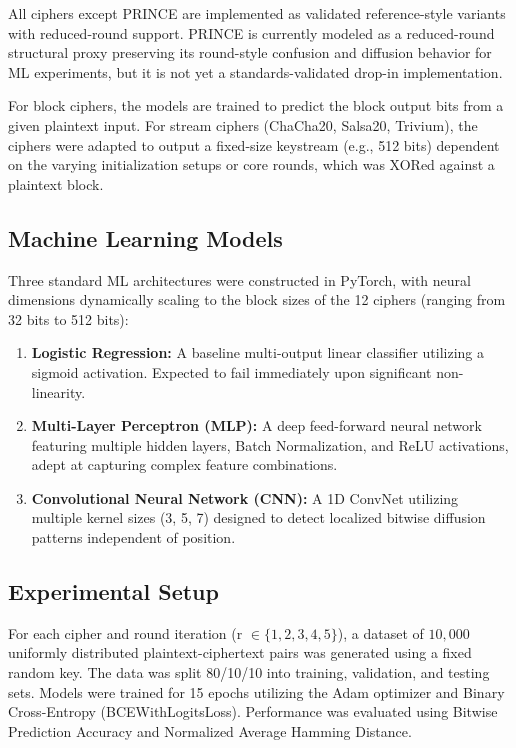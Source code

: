 \documentclass[11pt,a4paper]{article}
\begin{document}
All ciphers except PRINCE are implemented as validated reference-style variants with reduced-round support. PRINCE is currently modeled as a reduced-round structural proxy preserving its round-style confusion and diffusion behavior for ML experiments, but it is not yet a standards-validated drop-in implementation.

For block ciphers, the models are trained to predict the block output bits from a given plaintext input. For stream ciphers (ChaCha20, Salsa20, Trivium), the ciphers were adapted to output a fixed-size keystream (e.g., 512 bits) dependent on the varying initialization setups or core rounds, which was XORed against a plaintext block.

\subsection{Machine Learning Models}
Three standard ML architectures were constructed in PyTorch, with neural dimensions dynamically scaling to the block sizes of the 12 ciphers (ranging from 32 bits to 512 bits):
\begin{enumerate}
    \item \textbf{Logistic Regression:} A baseline multi-output linear classifier utilizing a sigmoid activation. Expected to fail immediately upon significant non-linearity.
    \item \textbf{Multi-Layer Perceptron (MLP):} A deep feed-forward neural network featuring multiple hidden layers, Batch Normalization, and ReLU activations, adept at capturing complex feature combinations.
    \item \textbf{Convolutional Neural Network (CNN):} A 1D ConvNet utilizing multiple kernel sizes (3, 5, 7) designed to detect localized bitwise diffusion patterns independent of position.
\end{enumerate}

\subsection{Experimental Setup}
For each cipher and round iteration (r $\in \{1, 2, 3, 4, 5\}$), a dataset of $10,000$ uniformly distributed plaintext-ciphertext pairs was generated using a fixed random key. The data was split 80/10/10 into training, validation, and testing sets. Models were trained for 15 epochs utilizing the Adam optimizer and Binary Cross-Entropy (BCEWithLogitsLoss). Performance was evaluated using Bitwise Prediction Accuracy and Normalized Average Hamming Distance.
\end{document}
